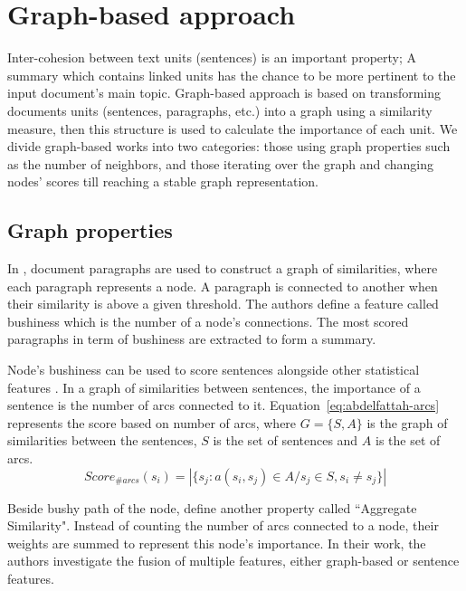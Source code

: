\section{Graph-based approach}

Inter-cohesion between text units (sentences) is an important property; A summary which contains linked units has the chance to be more pertinent to the input document's main topic.
Graph-based approach is based on transforming documents units (sentences, paragraphs, etc.) into a graph using a similarity measure, then this structure is used to calculate the importance of each unit. 
We divide graph-based works into two categories: those using graph properties such as the number of neighbors, and those iterating over the graph and changing nodes' scores till reaching a stable graph representation.

\subsection{Graph properties}

In \citep{97-salton-al}, document paragraphs are used to construct a graph of similarities, where each paragraph represents a node.
A paragraph is connected to another when their similarity is above a given threshold.
The authors define a feature called bushiness which is the number of a node's connections. 
The most scored paragraphs in term of bushiness are extracted to form a summary.

Node's bushiness can be used to score sentences alongside other statistical features \citep{09-abdelfattah-ren}.
In a graph of similarities between sentences, the importance of a sentence is the number of arcs connected to it.
Equation~\ref{eq:abdelfattah-arcs} represents the score based on number of arcs, where $ G =  \{S, A\} $ is the graph of similarities between the sentences, $ S $ is the set of sentences and $ A $ is the set of arcs.
\begin{equation}
	\label{eq:abdelfattah-arcs}
	Score_{\#arcs}(s_i) = |\{ s_j : a(s_i, s_j) \in A / s_j \in S, s_i \neq s_j \}|
\end{equation}

Beside bushy path of the node, \citet{14-ferreira-al} define another property called ``Aggregate Similarity". 
Instead of counting the number of arcs connected to a node, their weights are summed to represent this node's importance.
In their work, the authors investigate the fusion of multiple features, either graph-based or sentence features.


